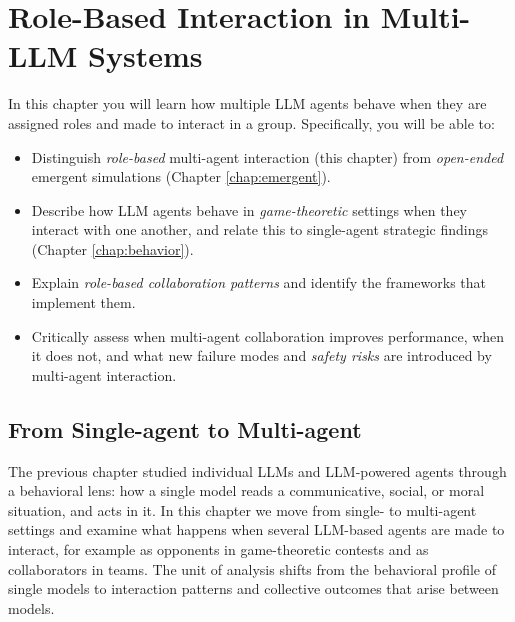 
\chapter{Role-Based Interaction in Multi-LLM Systems}\label{chap:roleint}\label{chap:role}

\begin{learningbox}
In this chapter you will learn how multiple LLM agents behave when they are assigned roles and made to interact in a group. Specifically, you will be able to:
\begin{itemize}[leftmargin=*, nosep]
    \item Distinguish {\em role-based} multi-agent interaction (this chapter) from {\em open-ended} emergent simulations (Chapter \ref{chap:emergent}).
    \item Describe how LLM agents behave in {\em game-theoretic} settings when they interact with one another, and relate this to single-agent strategic findings (Chapter \ref{chap:behavior}).
    \item Explain {\em role-based collaboration patterns} and identify the frameworks that implement them.
    \item Critically assess when  multi-agent collaboration improves performance, when it does not, and what new failure modes and {\em safety risks} are introduced by multi-agent interaction. 
\end{itemize}
\end{learningbox}

\section{From Single-agent to Multi-agent}
The previous chapter studied individual LLMs and LLM-powered agents through a behavioral lens: how a single model reads a communicative, social, or moral situation, and acts in it. In this chapter we move from single- to multi-agent settings and examine what happens when several LLM-based agents are made to interact, for example as opponents in game-theoretic contests and as collaborators in teams. The unit of analysis shifts from the behavioral profile of single models to interaction patterns and collective outcomes that arise between models.

